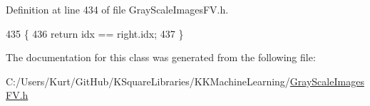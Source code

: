 Definition at line 434 of file Gray\+Scale\+Images\+F\+V.\+h.


\begin{DoxyCode}
435       \{
436         \textcolor{keywordflow}{return}  idx == right.idx;
437       \}
\end{DoxyCode}


The documentation for this class was generated from the following file\+:\begin{DoxyCompactItemize}
\item 
C\+:/\+Users/\+Kurt/\+Git\+Hub/\+K\+Square\+Libraries/\+K\+K\+Machine\+Learning/\hyperlink{_gray_scale_images_f_v_8h}{Gray\+Scale\+Images\+F\+V.\+h}\end{DoxyCompactItemize}
